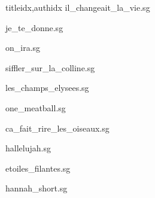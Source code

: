 \documentclass[
    fontsize=7pt
    ]{scrartcl}
\begin{document}
\begin{songs}{titleidx,authidx}
{il_changeait_la_vie.sg}


{je_te_donne.sg}


{on_ira.sg}


{siffler_sur_la_colline.sg}


{les_champs_elysees.sg}


{one_meatball.sg}


{ca_fait_rire_les_oiseaux.sg}


{hallelujah.sg}


{etoiles_filantes.sg}


{hannah_short.sg}


\end{songs}
\end{document}
